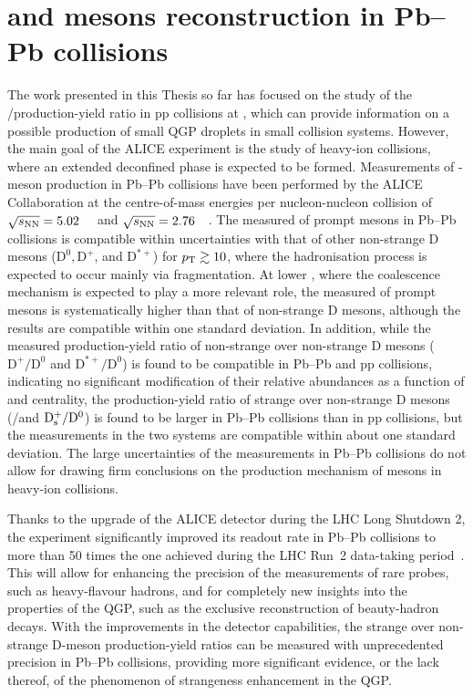 \chapter{\texorpdfstring{\ds and \dpl mesons reconstruction in Pb--Pb collisions}{Ds+ and D+ mesons reconstruction in Pb--Pb collisions}}
The work presented in this Thesis so far has focused on the study of the \ds/\dpl production-yield ratio in pp collisions at \thirteen, which can provide information on a possible production of small QGP droplets in small collision systems. However, the main goal of the ALICE experiment is the study of heavy-ion collisions, where an extended deconfined phase is expected to be formed. Measurements of \ds-meson production in Pb--Pb collisions have been performed by the ALICE Collaboration at the centre-of-mass energies per nucleon-nucleon collision of $\sqrt{s_\mathrm{NN}}=5.02$~\tev~\cite{ALICE:2021kfc,ALICE:2018lyv} and $\sqrt{s_\mathrm{NN}}=2.76$~\tev~\cite{ALICE:2015dry}. The measured \raa of prompt \ds mesons in Pb--Pb collisions is compatible within uncertainties with that of other non-strange D mesons ($\mathrm{D^0, D^+}$, and $\mathrm{D^{*+}}$) for $p_\mathrm{T}\gtrsim10$\gevc, where the hadronisation process is expected to occur mainly via fragmentation. At lower \pt, where the coalescence mechanism is expected to play a more relevant role, the measured \raa of prompt \ds mesons is systematically higher than that of non-strange D mesons, although the results are compatible within one standard deviation. In addition, while the measured production-yield ratio of non-strange over non-strange D mesons ($\mathrm{D^+/D^0}$ and $\mathrm{D^{*+}/D^0}$) is found to be compatible in Pb--Pb and pp collisions, indicating no significant modification of their relative abundances as a function of \pt and centrality, the production-yield ratio of strange over non-strange D mesons (\ds/\dpl and $\mathrm{D_s^+}/\mathrm{D^0}$) is found to be larger in Pb--Pb collisions than in pp collisions, but the measurements in the two systems are compatible within about one standard deviation. The large uncertainties of the measurements in Pb--Pb collisions do not allow for drawing firm conclusions on the production mechanism of \ds mesons in heavy-ion collisions.

Thanks to the upgrade of the ALICE detector during the LHC Long Shutdown 2, the experiment significantly improved its readout rate in Pb--Pb collisions to more than 50 times the one achieved during the LHC Run~2 data-taking period~\cite{ALICE:2023udb}. This will allow for enhancing the precision of the measurements of rare probes, such as heavy-flavour hadrons, and for completely new insights into the properties of the QGP, such as the exclusive reconstruction of beauty-hadron decays. With the improvements in the detector capabilities, the strange over non-strange D-meson production-yield ratios can be measured with unprecedented precision in Pb--Pb collisions, providing more significant evidence, or the lack thereof, of the phenomenon of strangeness enhancement in the QGP.

